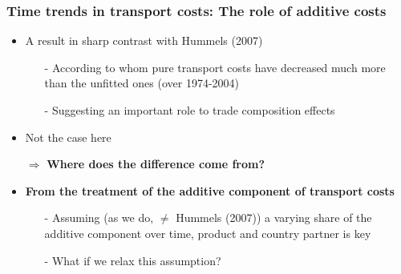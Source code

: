 \documentclass[10 pt,Helvetica, french]{beamer}
\begin{document}
\begin{frame}[label = slide_compeffects_comparison]
\frametitle{Time trends in transport costs: The role of additive costs}
\begin{itemize}
\item A result in sharp contrast with Hummels (2007) \vspace{0.1cm}
\begin{itemize}
\item[-] According to whom pure transport costs have decreased much more than the unfitted ones (over 1974-2004) \vspace{0.1cm}
\item[-] Suggesting an important role to trade composition effects  \vspace{0.1cm}
\end{itemize}
\item Not the case here \vspace{0.1cm}
\item[$\Rightarrow$] \textbf{Where does the difference come from?} \vspace{0.1cm}
\item \textbf{From the treatment of the additive component of transport costs} \hyperlink{app_compeffects_Hummels}{}\vspace{0.1cm}
\begin{itemize}
\item[-] Assuming (as we do, $\neq$ Hummels (2007)) a varying share of the additive component over time, product and country partner is key \vspace{0.1cm}
\item[-] What if we relax this assumption?
\end{itemize}\vspace{0.1cm}
\end{itemize}

\end{frame}
\end{document}
